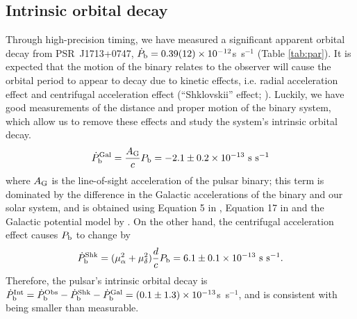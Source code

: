 \subsection{Intrinsic orbital decay}
\label{sec:obdecay}
Through high-precision timing, we have measured a significant apparent
orbital decay from PSR~J1713+0747, $\dot{P}_{\rm b} =
0.39(12)\times10^{-12}$s~s$^{-1}$ (Table \ref{tab:par}).
It is expected that the motion of the binary relates to the observer will
cause the orbital period to appear to decay due to kinetic effects, i.e. radial acceleration
effect \citep{dt91} and centrifugal acceleration effect (``Shklovskii'' effect;
\citealt{shk70}). Luckily, we have good measurements of the distance and proper
motion of the binary system, which allow us to remove these effects and study the system's intrinsic orbital decay.
\begin{equation}
\dot{P}_{\rm b}^{\rm Gal} = \frac{A_{\rm G}}{c} P_{\rm b} =
-2.1\pm0.2\times10^{-13}~{\rm s~s^{-1}}
\end{equation}
where $A_{\rm G}$ is the line-of-sight acceleration of the pulsar binary;
this term is dominated by the difference in the Galactic accelerations of the
binary and our solar system, and is obtained using
Equation 5 in \citet{nt95}, Equation 17 in \citet{lwj+09} and the Galactic
potential model by \citet{hf04a}.
On the other hand, the centrifugal acceleration effect causes $P_{\rm b}$ to
change by
\begin{equation}
\dot{P}_{\rm b}^{\rm Shk} = (\mu_{\alpha}^2+\mu_{\delta}^2)\frac{d}{c}P_{\rm
b} = 6.1\pm0.1\times10^{-13}~{\rm s~s^{-1}}.
\end{equation}
Therefore, the pulsar's intrinsic orbital decay is $\dot{P}_{\rm b}^{\rm Int}
= \dot{P}_{\rm b}^{\rm Obs} - \dot{P}_{\rm b}^{\rm Shk} - \dot{P}_{\rm b}^{\rm
Gal} = (0.1\pm1.3)\times10^{-13}$s~s$^{-1}$, and is consistent with being smaller than measurable.

